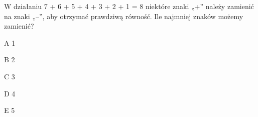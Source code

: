 \begin{tresc}
W działaniu 7 + 6 + 5 + 4 + 3 + 2 + 1 = 8 niektóre znaki „+” należy zamienić na znaki „–”, aby otrzymać prawdziwą równość. Ile najmniej znaków możemy zamienić?
\end{tresc}
\begin{wariant}{A} 1 \end{wariant}
\begin{wariant}{B} 2 \end{wariant}
\begin{wariant}{C} 3 \end{wariant}
\begin{wariant}{D} 4 \end{wariant}
\begin{wariant}{E} 5 \end{wariant}
